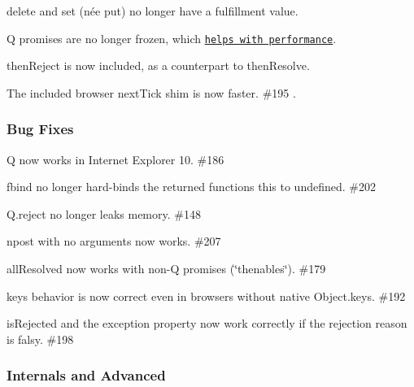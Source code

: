 \begin{DoxyItemize}
\item {\ttfamily delete} and {\ttfamily set} (née {\ttfamily put}) no longer have a fulfillment value.
\item Q promises are no longer frozen, which \href{http://code.google.com/p/v8/issues/detail?id=1858}{\tt helps with performance}.
\item {\ttfamily then\+Reject} is now included, as a counterpart to {\ttfamily then\+Resolve}.
\item The included browser {\ttfamily next\+Tick} shim is now faster. \#195 .
\end{DoxyItemize}

\subsubsection*{Bug Fixes}


\begin{DoxyItemize}
\item Q now works in Internet Explorer 10. \#186 
\item {\ttfamily fbind} no longer hard-\/binds the returned function\textquotesingle{}s {\ttfamily this} to {\ttfamily undefined}. \#202
\item {\ttfamily Q.\+reject} no longer leaks memory. \#148
\item {\ttfamily npost} with no arguments now works. \#207
\item {\ttfamily all\+Resolved} now works with non-\/Q promises (\char`\"{}thenables\char`\"{}). \#179
\item {\ttfamily keys} behavior is now correct even in browsers without native {\ttfamily Object.\+keys}. \#192 
\item {\ttfamily is\+Rejected} and the {\ttfamily exception} property now work correctly if the rejection reason is falsy. \#198
\end{DoxyItemize}

\subsubsection*{Internals and Advanced}


